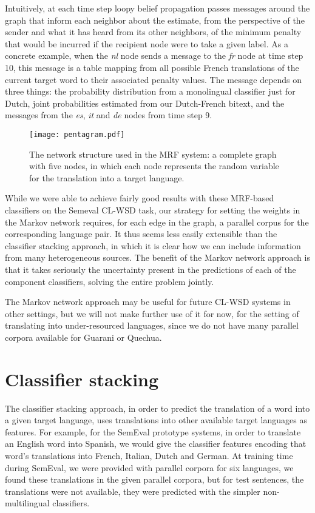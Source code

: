 Intuitively, at each time step loopy belief propagation passes messages around
the graph that inform each neighbor about the estimate, from the perspective of
the sender and what it has heard from its other neighbors, of the minimum
penalty that would be incurred if the recipient node were to take a given
label. As a concrete example, when the \emph{nl} node sends a message to the
\emph{fr} node at time step 10, this message is a table mapping from all
possible French translations of the current target word to their associated
penalty values. The message depends on three things: the probability
distribution from a monolingual classifier just for Dutch, joint probabilities
estimated from our Dutch-French bitext, and the messages from the \emph{es},
\emph{it} and \emph{de} nodes from time step 9.

\begin{figure}
  \begin{center}
  \texttt{[image: pentagram.pdf]}
  \end{center}
  \caption{The network structure used in the MRF system: a complete graph with
  five nodes, in which each node represents the random variable for the
  translation into a target language.}
  \label{fig:pentagram}
\end{figure}

While we were able to achieve fairly good results with these MRF-based
classifiers on the Semeval CL-WSD task, our strategy for setting the weights in
the Markov network requires, for each edge in the graph, a parallel corpus for
the corresponding language pair.
It thus seems less easily extensible than the classifier stacking approach, in
which it is clear how we can include information from many heterogeneous
sources. The benefit of the Markov network approach is that it takes seriously
the uncertainty present in the predictions of each of the component
classifiers, solving the entire problem jointly.

The Markov network approach may be useful for future CL-WSD systems in other
settings, but we will not make further use of it for now, for the setting of
translating into under-resourced languages, since we do not have many parallel
corpora available for Guarani or Quechua.

\section{Classifier stacking}
The classifier stacking approach, in order to predict the translation of a word
into a given target language, uses translations into other available target
languages as features.
For example, for the SemEval prototype systems, in order to translate an
English word into Spanish, we would give the classifier features encoding that
word's translations into French, Italian, Dutch and German.
At training time during SemEval, we were provided with parallel corpora for six
languages, we found these translations in the given parallel corpora, but
for test sentences, the translations were not available, they were predicted
with the simpler non-multilingual classifiers.

